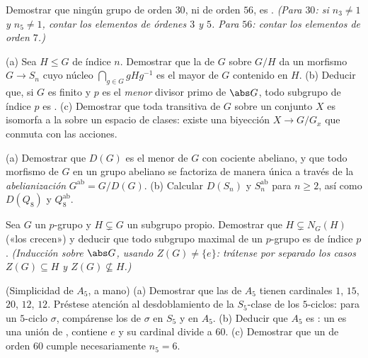 \begin{exercise}[$\star\star$]\label{exo:b3:groups:7}
Demostrar que ningún grupo de orden $30$, ni de orden $56$, es
. \emph{(Para $30$: si $n_3 \neq 1$
y $n_5 \neq 1$, contar los elementos de órdenes $3$ y $5$. Para $56$:
contar los elementos de orden $7$.)}
\end{exercise}

\begin{exercise}[$\star\star$]\label{exo:b3:groups:8}
(a) Sea $H \leq G$ de índice $n$. Demostrar que la
 de $G$ sobre $G/H$ da un morfismo
$G \to S_n$ cuyo núcleo $\bigcap_{g \in
G} gHg^{-1}$ es el mayor 
de $G$ contenido en
$H$.
(b) Deducir que, si $G$ es finito y $p$ es el \emph{menor} divisor primo
de $\abs G$, todo subgrupo de índice $p$ es
. (c) Demostrar que toda
 transitiva de $G$ sobre un
conjunto $X$ es isomorfa a la 
sobre un espacio de clases: existe una biyección $X
\to G/G_x$ que conmuta con las acciones.
\end{exercise}

\begin{exercise}[$\star\star$]\label{exo:b3:groups:9}
(a) Demostrar que $D(G)$ es el menor
 de $G$ con cociente
abeliano, y que todo morfismo de $G$ en un grupo abeliano se factoriza
de manera única a través de la \emph{abelianización}
$G^{\mathrm{ab}} = G/D(G)$.
(b) Calcular $D(S_n)$ y $S_n^{\mathrm{ab}}$ para $n \geq 2$, así como
$D(Q_8)$ y $Q_8^{\mathrm{ab}}$.
\end{exercise}

\begin{exercise}[$\star\star$]\label{exo:b3:groups:10}
Sea $G$ un $p$-grupo y $H \subsetneq G$ un subgrupo propio. Demostrar
que $H \subsetneq N_G(H)$ («los
 crecen») y deducir que
todo subgrupo maximal de un $p$-grupo es
 de índice $p$. \emph{(Inducción
sobre $\abs G$, usando $Z(G) \neq \{e\}$: trátense por separado los
casos $Z(G) \subseteq H$ y $Z(G) \not\subseteq H$.)}
\end{exercise}

\begin{exercise}[$\star\star\star$]\label{exo:b3:groups:11}
(Simplicidad de $A_5$, a mano) (a) Demostrar que las
 de $A_5$ tienen
cardinales $1$, $15$, $20$, $12$, $12$. Préstese atención al
desdoblamiento de la $S_5$-clase de los $5$-ciclos: para un $5$-ciclo
$\sigma$, compárense los 
de $\sigma$ en $S_5$ y en $A_5$. (b) Deducir que $A_5$ es
: un
 es una unión de
, contiene $e$ y su
cardinal divide a
$60$.
(c) Demostrar que un  de
orden $60$ cumple necesariamente $n_5 =
6$.
\end{exercise}

